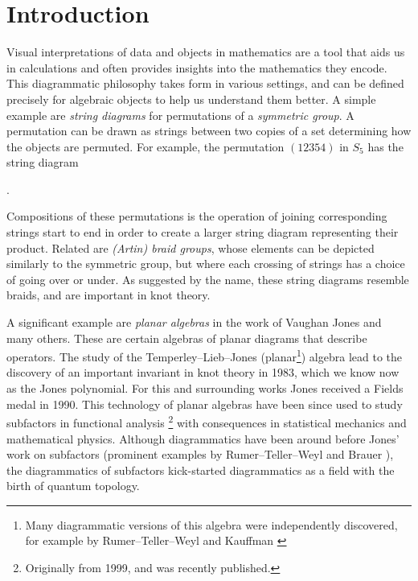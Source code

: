 \chapter{Introduction}

Visual interpretations of data and objects in mathematics are a tool that aids us in calculations and often provides insights into the mathematics they encode. This diagrammatic philosophy takes form in various settings, and can be defined precisely for algebraic objects to help us understand them better. A simple example are \textit{string diagrams} for permutations of a \textit{symmetric group}. A permutation can be drawn as strings between two copies of a set determining how the objects are permuted. For example, the permutation $(12354)$ in $S_5$ has the string diagram
\begin{center}
    .
\end{center}
Compositions of these permutations is the operation of joining corresponding strings start to end in order to create a larger string diagram representing their product. Related are \textit{(Artin) braid groups}, whose elements can be depicted similarly to the symmetric group, but where each crossing of strings has a choice of going over or under. As suggested by the name, these string diagrams resemble braids, and are important in knot theory.

A significant example are \textit{planar algebras} in the work of Vaughan Jones and many others. These are certain algebras of planar diagrams that describe operators. The study of the Temperley--Lieb--Jones (planar\footnote{Many diagrammatic versions of this algebra were independently discovered, for example by Rumer--Teller--Weyl \cite{weyl-diagrammatics} and Kauffman \cite{kauffman-tl-planar-algebra}}) algebra lead to the discovery of an important invariant in knot theory \cite{jones-knot-polynomial} in 1983, which we know now as the Jones polynomial. For this and surrounding works Jones received a Fields medal in 1990. This technology of planar algebras have been since used to study subfactors in functional analysis \cite{jones-planar-algebra}\footnote{Originally from 1999, and was recently published.} with consequences in statistical mechanics and mathematical physics. Although diagrammatics have been around before Jones' work on subfactors (prominent examples by Rumer--Teller--Weyl \cite{weyl-diagrammatics} and Brauer \cite{brauer-diagrammatics}), the diagrammatics of subfactors kick-started diagrammatics as a field with the birth of quantum topology.

